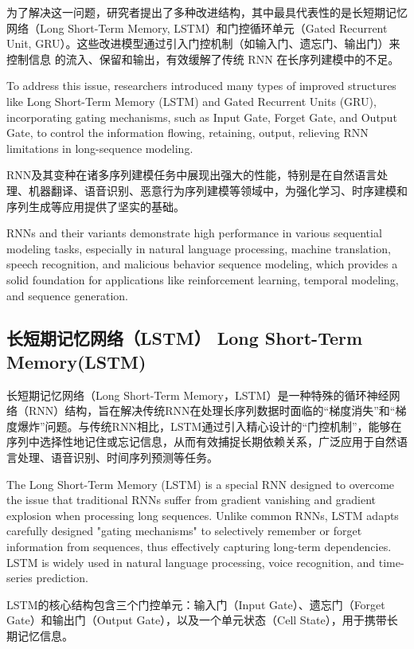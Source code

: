 为了解决这一问题，研究者提出了多种改进结构，其中最具代表性的是长短期记忆网络（Long Short-Term Memory, LSTM）和门控循环单元（Gated Recurrent Unit, GRU）。这些改进模型通过引入门控机制（如输入门、遗忘门、输出门）来控制信息
的流入、保留和输出，有效缓解了传统 RNN 在长序列建模中的不足。

To address this issue, researchers introduced many types of improved structures like Long Short-Term Memory (LSTM) and Gated Recurrent Units (GRU), incorporating gating mechanisms, such as Input Gate, Forget Gate, and Output Gate, to control the information flowing, retaining, output, relieving RNN limitations in long-sequence modeling.

RNN及其变种在诸多序列建模任务中展现出强大的性能，特别是在自然语言处理、机器翻译、语音识别、恶意行为序列建模等领域中，为强化学习、时序建模和序列生成等应用提供了坚实的基础。

RNNs and their variants demonstrate high performance in various sequential modeling tasks, especially in natural language processing, machine translation, speech recognition, and malicious behavior sequence modeling, which provides a solid foundation for applications like reinforcement learning, temporal modeling, and sequence generation.

\subsection{长短期记忆网络（LSTM） Long Short-Term Memory(LSTM)}

长短期记忆网络（Long Short-Term Memory，LSTM）\cite{graves2012long}是一种特殊的循环神经网络（RNN）结构，旨在解决传统RNN在处理长序列数据时面临的“梯度消失”和“梯度爆炸”问题。与传统RNN相比，LSTM通过引入精心设计的“门控机制”，能够在序列中选择性地记住或忘记信息，从而有效捕捉长期依赖关系，广泛应用于自然语言处理、语音识别、时间序列预测等任务。

The Long Short-Term Memory (LSTM) \cite{graves2012long} is a special RNN designed to overcome the issue that traditional RNNs suffer from gradient vanishing and gradient explosion when processing long sequences. Unlike common RNNs, LSTM adapts carefully designed "gating mechanisms" to selectively remember or forget information from sequences, thus effectively capturing long-term dependencies. LSTM is widely used in natural language processing, voice recognition, and time-series prediction.

LSTM的核心结构包含三个门控单元：输入门（Input Gate）、遗忘门（Forget Gate）和输出门（Output Gate），以及一个单元状态（Cell State），用于携带长期记忆信息。

